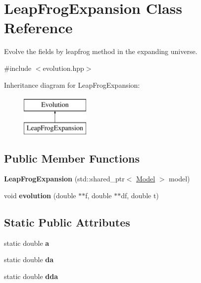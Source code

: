 \hypertarget{class_leap_frog_expansion}{}\section{Leap\+Frog\+Expansion Class Reference}
\label{class_leap_frog_expansion}


Evolve the fields by leapfrog method in the expanding universe.  




{\ttfamily \#include $<$evolution.\+hpp$>$}

Inheritance diagram for Leap\+Frog\+Expansion\+:\begin{figure}[H]
\begin{center}
\leavevmode
\includegraphics[height=2.000000cm]{class_leap_frog_expansion}
\end{center}
\end{figure}
\subsection*{Public Member Functions}
\begin{DoxyCompactItemize}
\item 
\mbox{\label{class_leap_frog_expansion_a8df00d93429f710e92165aea20e508de}} 
{\bfseries Leap\+Frog\+Expansion} (std\+::shared\+\_\+ptr$<$ \mbox{\hyperlink{class_model}{Model}} $>$ model)
\item 
\mbox{\label{class_leap_frog_expansion_a27854e0461bb73d00876439cf734aff6}} 
void {\bfseries evolution} (double $\ast$$\ast$f, double $\ast$$\ast$df, double t)
\end{DoxyCompactItemize}
\subsection*{Static Public Attributes}
\begin{DoxyCompactItemize}
\item 
\mbox{\label{class_leap_frog_expansion_a135b5611dda57d9b5c8e93696d7fc7d4}} 
static double {\bfseries a}
\item 
\mbox{\label{class_leap_frog_expansion_aa99847d640fb05bd51e0a2398080ba1e}} 
static double {\bfseries da}
\item 
\mbox{\label{class_leap_frog_expansion_a069435e3c2d81a3fbed7c786bc53a536}} 
static double {\bfseries dda}
\end{DoxyCompactItemize}
